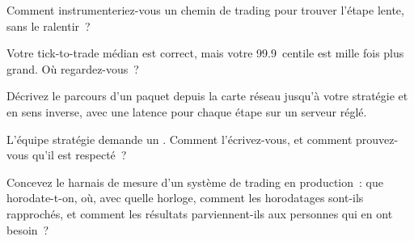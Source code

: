 \begin{interviewq}\label{iq:ll:build-tick-to-trade-measured:2}
Comment instrumenteriez-vous un chemin de trading pour trouver l'étape lente, sans le ralentir~?
\end{interviewq}

\begin{interviewq}\label{iq:ll:build-tick-to-trade-measured:3}
Votre tick-to-trade médian est correct, mais votre 99.9~centile est mille fois plus grand. Où regardez-vous~?
\end{interviewq}

\begin{interviewq}\label{iq:ll:build-tick-to-trade-measured:4}
Décrivez le parcours d'un paquet depuis la carte réseau jusqu'à votre stratégie et en sens inverse, avec une latence pour chaque étape sur un
serveur réglé.
\end{interviewq}

\begin{interviewq}\label{iq:ll:build-tick-to-trade-measured:5}
L'équipe stratégie demande un . Comment l'écrivez-vous, et comment prouvez-vous qu'il est respecté~?
\end{interviewq}

\begin{interviewq}\label{iq:ll:build-tick-to-trade-measured:6}
Concevez le harnais de mesure d'un système de trading en production~: que horodate-t-on, où, avec quelle horloge, comment les horodatages
sont-ils rapprochés, et comment les résultats parviennent-ils aux personnes qui en ont besoin~?
\end{interviewq}
